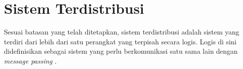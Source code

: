 \section{Sistem Terdistribusi}

Sesuai batasan yang telah ditetapkan, sistem terdistribusi adalah sistem yang terdiri dari lebih dari satu perangkat yang terpisah secara logis. Logis di sini didefinisikan sebagai sistem yang perlu berkomunikasi satu sama lain dengan \textit{message passing} \parencite{coulouris2012distributed}.


